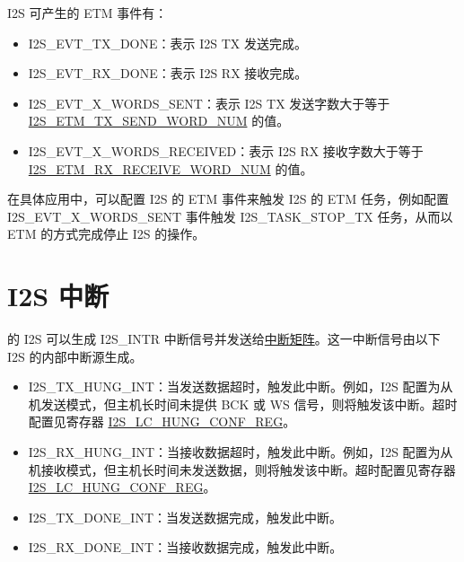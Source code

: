 \documentclass[main\_\_CN.tex]{subfiles}
\begin{document}
I2S 可产生的 ETM 事件有：

\begin{itemize}
    \item \label{evt:I2SEVTTXDONE}I2S\_EVT\_TX\_DONE：表示 I2S TX 发送完成。
    \item \label{evt:I2SEVTRXDONE}I2S\_EVT\_RX\_DONE：表示 I2S RX 接收完成。
    \item \label{evt:I2SEVTXWORDSSENT}I2S\_EVT\_X\_WORDS\_SENT：表示 I2S TX 发送字数大于等于 \hyperref[fielddesc:I2SETMTXSENDWORDNUM]{I2S\_ETM\_TX\_SEND\_WORD\_NUM} 的值。
    \item \label{evt:I2SEVTXWORDSRECEIVED}I2S\_EVT\_X\_WORDS\_RECEIVED：表示 I2S RX 接收字数大于等于 \hyperref[fielddesc:I2SETMRXRECEIVEWORDNUM]{I2S\_ETM\_RX\_RECEIVE\_WORD\_NUM} 的值。
\end{itemize}

在具体应用中，可以配置 I2S 的 ETM 事件来触发 I2S 的 ETM 任务，例如配置 I2S\_EVT\_X\_WORDS\_SENT 事件触发 I2S\_TASK\_STOP\_TX 任务，从而以 ETM 的方式完成停止 I2S 的操作。



\section{I2S 中断} \label{sec:i2s-interrupts}

\chipname{} 的 I2S 可以生成 I2S\_INTR 中断信号并发送给\hyperref[mod:intmtrx]{中断矩阵}。这一中断信号由以下 I2S 的内部中断源生成。

\begin{itemize}
\item \label{int:I2STXHUNGINT}I2S\_TX\_HUNG\_INT：当发送数据超时，触发此中断。例如，I2S 配置为从机发送模式，但主机长时间未提供 BCK 或 WS 信号，则将触发该中断。超时配置见寄存器 \hyperref[regdesc:I2SLCHUNGCONFREG]{I2S\_LC\_HUNG\_CONF\_REG}。
\item \label{int:I2SRXHUNGINT}I2S\_RX\_HUNG\_INT：当接收数据超时，触发此中断。例如，I2S 配置为从机接收模式，但主机长时间未发送数据，则将触发该中断。超时配置见寄存器 \hyperref[regdesc:I2SLCHUNGCONFREG]{I2S\_LC\_HUNG\_CONF\_REG}。
\item \label{int:I2STXDONEINT}I2S\_TX\_DONE\_INT：当发送数据完成，触发此中断。
\item \label{int:I2SRXDONEINT}I2S\_RX\_DONE\_INT：当接收数据完成，触发此中断。
\end{itemize}
\end{document}
